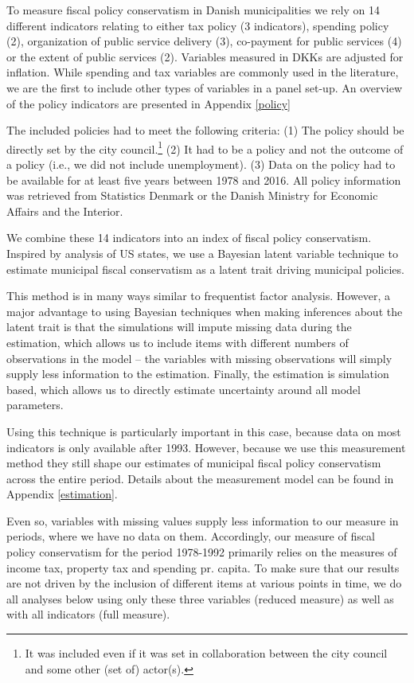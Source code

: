 \documentclass[a4paper,12pt]{article}
\begin{document}
To measure fiscal policy conservatism in Danish municipalities we rely on 14 different indicators relating to either tax policy (3 indicators), spending policy (2), organization of public service delivery (3), co-payment for public services (4) or the extent of public services (2). Variables measured in DKKs are adjusted for inflation. While  spending and tax variables are commonly used in the literature, we are the first to include other types of variables in a panel set-up. An overview of the policy indicators are presented in Appendix \ref{policy}

The included policies had to meet the following criteria: (1) The policy should be directly set by the city council.\footnote{It was included even if it was set in collaboration between the city council and some other (set of) actor(s).} (2) It had to be a policy and not the outcome of a policy (i.e., we did not include unemployment). (3) Data on the policy had to be available for at least five years between 1978 and 2016. All policy information was retrieved from Statistics Denmark or the Danish Ministry for Economic Affairs and the Interior.

We combine these 14 indicators into an index of fiscal policy conservatism. Inspired by \cite{caughey2016dynamics} analysis of US states, we use a Bayesian latent variable technique to estimate municipal fiscal conservatism as a latent trait driving municipal policies. 

This method is in many ways similar to frequentist factor analysis. However, a major advantage to using Bayesian techniques when making inferences about the latent trait is that the simulations will impute missing data during the estimation, which allows us to include items with different numbers of observations in the model -- the variables with missing observations will simply supply less information to the estimation. Finally, the estimation is simulation based, which allows us to directly estimate uncertainty around all model parameters.

Using this technique is particularly important in this case, because data on most indicators is only available after 1993. However, because we use this measurement method they still shape our estimates of municipal fiscal policy conservatism across the entire period. Details about the measurement model can be found in Appendix \ref{estimation}. 

Even so, variables with missing values supply less information to our measure in periods, where we have no data on them. Accordingly, our measure of fiscal policy conservatism for the period 1978-1992 primarily relies on the measures of income tax, property tax and spending pr. capita. To make sure that our results are not driven by the inclusion of different items at various points in time, we do all analyses below using only these three variables (reduced measure) as well as with all indicators (full measure).
\end{document}
